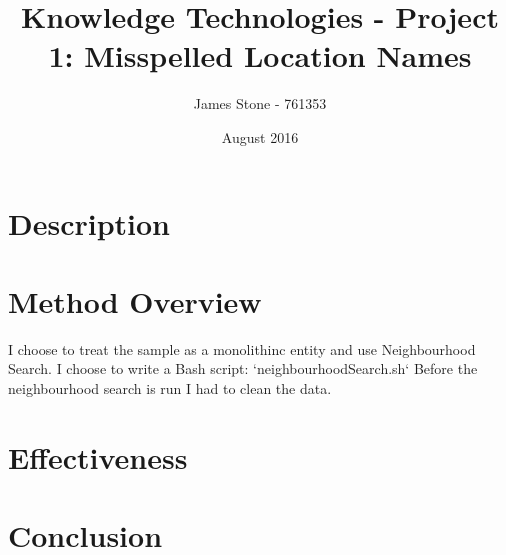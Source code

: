 \documentclass[a4paper]{article}
\title{Knowledge Technologies - Project 1: Misspelled Location Names}
\author{James Stone - 761353}
\date{August 2016}
\begin{document}
\maketitle

\section{Description}
\section{Method Overview}
I choose to treat the sample as a monolithinc entity and use Neighbourhood Search.
I choose to write a Bash script:  `neighbourhoodSearch.sh`
Before the neighbourhood search is run I had to clean the data.
\section{Effectiveness}
\section{Conclusion}
\end{document}
